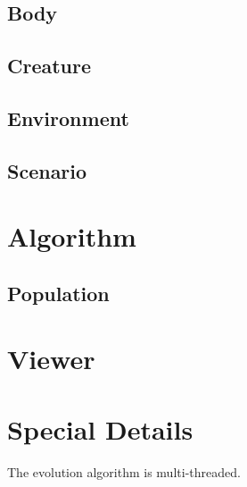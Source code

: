 \documentclass[../../main.tex]{subfiles}
\begin{document}
	\subsection{Body}
	\subsection{Creature}
	\subsection{Environment}
	\subsection{Scenario}

\section{Algorithm}
	\subsection{Population}

\section{Viewer}

\section{Special Details}
	The evolution algorithm is multi-threaded.
\end{document}
